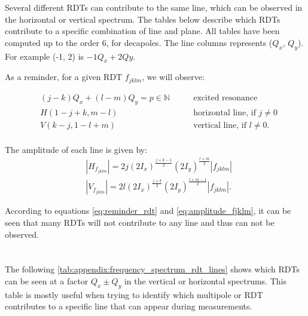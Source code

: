 Several different RDTs can contribute to the same line, which can be observed in the horizontal or
vertical spectrum. The tables below describe which RDTs contribute to a specific combination of line
and plane.  All tables have been computed up to the order 6, for decapoles. The line columns
represents ($Q_x$, $Q_y$). For example (-1, 2) is \(-1Q_x + 2Qy\).

As a reminder, for a given RDT $f_{jklm}$, we will observe:

\begin{equation}\begin{aligned}
& (j-k)Q_x + (l-m)Q_y = p \in \mathbb{N} \quad\quad& \mbox{excited resonance}\\
& H(1 - j + k, m - l) \quad\quad& \mbox{horizontal line, if } j \ne 0 \\
& V(k - j, 1 - l + m) \quad\quad& \mbox{vertical line, if } l \ne 0. \\
\end{aligned}
\label{eq:reminder_rdt}
\end{equation}

The amplitude of each line is given by:
\begin{equation}
    \begin{aligned}
    &|H_{f_{jklm}}| = 2 j (2 I_x)^\frac{j+k-1}{2} (2 I_y)^\frac{l+m}{2} |f_{jklm}| \\
    &|V_{f_{jklm}}| = 2 l (2 I_x)^\frac{j+k}{2} (2 I_y)^\frac{l+m-1}{2} |f_{jklm}|.
    \label{eq:amplitude_fjklm}
    \end{aligned}
\end{equation}

According to equations \ref{eq:reminder_rdt} and \ref{eq:amplitude_fjklm}, it can be seen that many
RDTs will not contribute to any line and thus can not be observed.



\section{}

The following \cref{tab:appendix:frequency_spectrum_rdt_lines} shows which RDTs can be seen at a 
factor $Q_x \pm Q_y$ in the vertical or horizontal spectrums. This table is mostly useful when
trying to identify which multipole or RDT contributes to a specific line that can appear during 
measurements.

